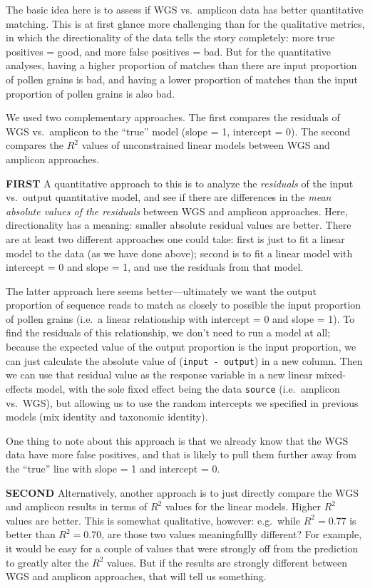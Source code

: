 \documentclass[
]{article}
\begin{document}
The basic idea here is to assess if WGS vs.~amplicon data has better
quantitative matching. This is at first glance more challenging than for
the qualitative metrics, in which the directionality of the data tells
the story completely: more true positives = good, and more false
positives = bad. But for the quantitative analyses, having a higher
proportion of matches than there are input proportion of pollen grains
is bad, and having a lower proportion of matches than the input
proportion of pollen grains is also bad.

We used two complementary approaches. The first compares the residuals
of WGS vs.~amplicon to the ``true'' model (slope = 1, intercept = 0).
The second compares the \(R^2\) values of unconstrained linear models
between WGS and amplicon approaches.

\textbf{FIRST} A quantitative approach to this is to analyze the
\emph{residuals} of the input vs.~output quantitative model, and see if
there are differences in the \emph{mean absolute values of the
residuals} between WGS and amplicon approaches. Here, directionality has
a meaning: smaller absolute residual values are better. There are at
least two different approaches one could take: first is just to fit a
linear model to the data (as we have done above); second is to fit a
linear model with intercept = 0 and slope = 1, and use the residuals
from that model.

The latter approach here seems better---ultimately we want the output
proportion of sequence reads to match as closely to possible the input
proportion of pollen grains (i.e.~a linear relationship with intercept =
0 and slope = 1). To find the residuals of this relationship, we don't
need to run a model at all; because the expected value of the output
proportion is the input proportion, we can just calculate the absolute
value of (\texttt{input\ -\ output}) in a new column. Then we can use
that residual value as the response variable in a new linear
mixed-effects model, with the sole fixed effect being the data
\texttt{source} (i.e.~amplicon vs.~WGS), but allowing us to use the
random intercepts we specified in previous models (mix identity and
taxonomic identity).

One thing to note about this approach is that we already know that the
WGS data have more false positives, and that is likely to pull them
further away from the ``true'' line with slope = 1 and intercept = 0.

\textbf{SECOND} Alternatively, another approach is to just directly
compare the WGS and amplicon results in terms of \(R^2\) values for the
linear models. Higher \(R^2\) values are better. This is somewhat
qualitative, however: e.g.~while \(R^2 = 0.77\) is better than
\(R^2 = 0.70\), are those two values meaningfullly different? For
example, it would be easy for a couple of values that were strongly off
from the prediction to greatly alter the \(R^2\) values. But if the
results are strongly different between WGS and amplicon approaches, that
will tell us something.
\end{document}

